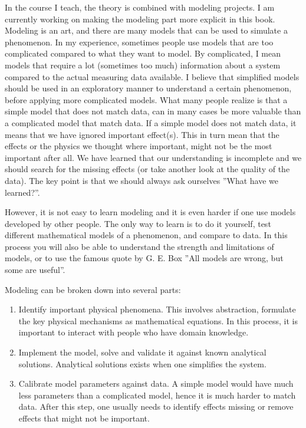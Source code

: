 \documentclass[graybox,sectrefs,envcountresetchap,open=right,final]{svmonodo}
\begin{document}
In the course I teach, the theory is combined with modeling projects. I am currently working on making the modeling part more explicit in this book. Modeling is an art, and there are many models that can be used to simulate a phenomenon. In my experience, sometimes people use models that are too complicated compared to what they want to model. By complicated, I mean models that require a lot (sometimes too much) information about a system compared to the actual measuring data available. I believe that simplified models should be used in an exploratory manner to understand a certain phenomenon, before applying more complicated models. What many people realize is that a simple model that does not match data, can in many cases be more valuable than a complicated model that match data. If a simple model does not match data, it means that we have ignored important effect(s). This in turn mean that the effects or the physics we thought where important, might not be the most important after all. We have learned that our understanding is incomplete and we should search for the missing effects (or take another look at the quality of the data). The key point is that we should always ask ourselves ''What have we learned?''.

However, it is not easy to learn modeling and it is even harder if one use models developed by other people. The only way to learn is to do it yourself, test different mathematical models of a phenomenon, and compare to data. In this process you will also be able to understand the strength and limitations of models, or to use the famous quote by G. E. Box ''All models are wrong, but some are useful''.

Modeling can be broken down into several parts: 
\begin{enumerate}
\item Identify important physical phenomena. This involves abstraction, formulate the key physical mechanisms as mathematical equations. In this process, it is important to interact with people who have domain knowledge.

\item Implement the model, solve and validate it against known analytical solutions. Analytical solutions exists when one simplifies the system.

\item Calibrate model parameters against data. A simple model would have much less parameters than a complicated model, hence it is much harder to match data. After this step, one usually needs to identify effects missing or remove effects that might not be important.
\end{enumerate}
\end{document}
